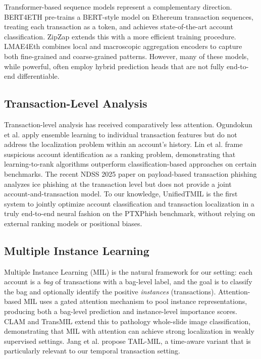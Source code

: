 \documentclass[conference]{IEEEtran}
\begin{document}
Transformer-based sequence models represent a complementary direction. BERT4ETH \cite{bert4eth} pre-trains a BERT-style model on Ethereum transaction sequences, treating each transaction as a token, and achieves state-of-the-art account classification. ZipZap \cite{zipzap} extends this with a more efficient training procedure. LMAE4Eth \cite{lmae4eth} combines local and macroscopic aggregation encoders to capture both fine-grained and coarse-grained patterns. However, many of these models, while powerful, often employ hybrid prediction heads that are not fully end-to-end differentiable.

\subsection{Transaction-Level Analysis}
Transaction-level analysis has received comparatively less attention. Ogundokun et al. \cite{ogundokun} apply ensemble learning to individual transaction features but do not address the localization problem within an account's history. Lin et al. \cite{lin_ranking} frame suspicious account identification as a ranking problem, demonstrating that learning-to-rank algorithms outperform classification-based approaches on certain benchmarks. The recent NDSS 2025 paper on payload-based transaction phishing \cite{usenix_poisoning} analyzes ice phishing at the transaction level but does not provide a joint account-and-transaction model. To our knowledge, UnifiedTMIL is the first system to jointly optimize account classification and transaction localization in a truly end-to-end neural fashion on the PTXPhish benchmark, without relying on external ranking models or positional biases.

\subsection{Multiple Instance Learning}
Multiple Instance Learning (MIL) \cite{mil_survey} is the natural framework for our setting: each account is a \emph{bag} of transactions with a bag-level label, and the goal is to classify the bag and optionally identify the positive \emph{instances} (transactions). Attention-based MIL \cite{ilse2018} uses a gated attention mechanism to pool instance representations, producing both a bag-level prediction and instance-level importance scores. CLAM \cite{clam} and TransMIL \cite{transmil} extend this to pathology whole-slide image classification, demonstrating that MIL with attention can achieve strong localization in weakly supervised settings. Jang et al. \cite{tail_mil} propose TAIL-MIL, a time-aware variant that is particularly relevant to our temporal transaction setting.
\end{document}
